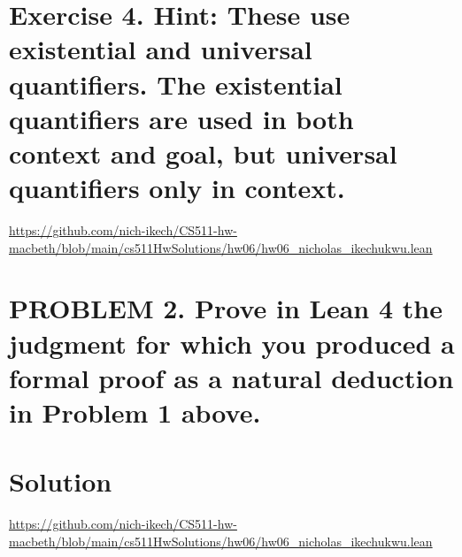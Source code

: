 \documentclass{article}
\begin{document}
\section*{Exercise 4. Hint: These use existential and universal quantifiers. The existential quantifiers are used in both
context and goal, but universal quantifiers only in context.}

\url{https://github.com/nich-ikech/CS511-hw-macbeth/blob/main/cs511HwSolutions/hw06/hw06_nicholas_ikechukwu.lean}

\newpage

\section*{PROBLEM 2. Prove in Lean 4 the judgment for which you produced a formal proof as a natural
deduction in Problem 1 above.}
\section*{Solution}

\url{https://github.com/nich-ikech/CS511-hw-macbeth/blob/main/cs511HwSolutions/hw06/hw06_nicholas_ikechukwu.lean}
\end{document}

